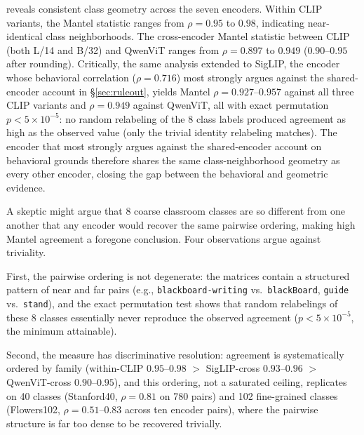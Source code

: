 \documentclass[a4paper,fleqn]{cas-sc}
\begin{document}
 reveals consistent class geometry across the seven encoders. Within CLIP variants, the Mantel statistic ranges from $\rho=0.95$ to $0.98$, indicating near-identical class neighborhoods. The cross-encoder Mantel statistic between CLIP (both L/14 and B/32) and QwenViT ranges from $\rho=0.897$ to $0.949$ ($0.90$--$0.95$ after rounding). Critically, the same analysis extended to SigLIP, the encoder whose behavioral correlation ($\rho=0.716$) most strongly argues against the shared-encoder account in \S\ref{sec:ruleout}, yields Mantel $\rho=0.927$--$0.957$ against all three CLIP variants and $\rho=0.949$ against QwenViT, all with exact permutation $p<5\times10^{-5}$: no random relabeling of the 8 class labels produced agreement as high as the observed value (only the trivial identity relabeling matches). The encoder that most strongly argues against the shared-encoder account on behavioral grounds therefore shares the same class-neighborhood geometry as every other encoder, closing the gap between the behavioral and geometric evidence.

A skeptic might argue that 8 coarse classroom classes are so different from one another that any encoder would recover the same pairwise ordering, making high Mantel agreement a foregone conclusion. Four observations argue against triviality.

First, the pairwise ordering is not degenerate: the matrices contain a structured pattern of near and far pairs (e.g., \texttt{blackboard-writing} vs.\ \texttt{blackBoard}, \texttt{guide} vs.\ \texttt{stand}), and the exact permutation test shows that random relabelings of these 8 classes essentially never reproduce the observed agreement ($p<5\times10^{-5}$, the minimum attainable).

Second, the measure has discriminative resolution: agreement is systematically ordered by family (within-CLIP $0.95$--$0.98$ $>$ SigLIP-cross $0.93$--$0.96$ $>$ QwenViT-cross $0.90$--$0.95$), and this ordering, not a saturated ceiling, replicates on 40 classes (Stanford40, $\rho=0.81$ on 780 pairs) and 102 fine-grained classes (Flowers102, $\rho=0.51$--$0.83$ across ten encoder pairs), where the pairwise structure is far too dense to be recovered trivially.
\end{document}

